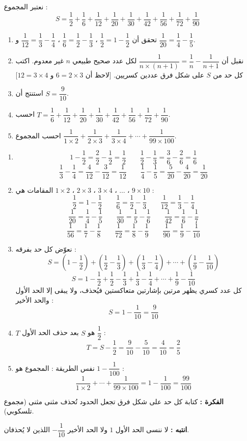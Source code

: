 \documentclass[12pt,a4paper]{article}
\begin{document}
\begin{corr}[title={مجموع تسعة أعداد كسرية}, stars=4, source={Axiomaths}]
نعتبر المجموع :
\[S=\dfrac{1}{2}+\dfrac{1}{6}+\dfrac{1}{12}+\dfrac{1}{20}+\dfrac{1}{30}+\dfrac{1}{42}+\dfrac{1}{56}+\dfrac{1}{72}+\dfrac{1}{90}\]
\begin{enumerate}
  \item تحقق أن $\dfrac{1}{2}=1-\dfrac{1}{2}$ ، $\dfrac{1}{6}=\dfrac{1}{2}-\dfrac{1}{3}$ ، $\dfrac{1}{12}=\dfrac{1}{3}-\dfrac{1}{4}$ و $\dfrac{1}{20}=\dfrac{1}{4}-\dfrac{1}{5}$.
  \item نقبل أن $\dfrac{1}{n\times(n+1)}=\dfrac{1}{n}-\dfrac{1}{n+1}$ لكل عدد صحيح طبيعي $n$ غير معدوم.
  اكتب كل حد من $S$ على شكل فرق عددين كسريين. [لاحظ أن $6=2\times3$ و $12=3\times4$]
  \item استنتج أن $S=\dfrac{9}{10}$.
  \item احسب $T=\dfrac{1}{6}+\dfrac{1}{12}+\dfrac{1}{20}+\dfrac{1}{30}+\dfrac{1}{42}+\dfrac{1}{56}+\dfrac{1}{72}+\dfrac{1}{90}$.
  \item احسب المجموع $\dfrac{1}{1\times2}+\dfrac{1}{2\times3}+\dfrac{1}{3\times4}+\cdots+\dfrac{1}{99\times100}$.
\end{enumerate}
\axsol
\begin{enumerate}[itemsep=14pt]
  \item
  \[1-\dfrac{1}{2}=\dfrac{2}{2}-\dfrac{1}{2}=\dfrac{1}{2}\qquad\dfrac{1}{2}-\dfrac{1}{3}=\dfrac{3}{6}-\dfrac{2}{6}=\dfrac{1}{6}\]
  \[\dfrac{1}{3}-\dfrac{1}{4}=\dfrac{4}{12}-\dfrac{3}{12}=\dfrac{1}{12}\qquad\dfrac{1}{4}-\dfrac{1}{5}=\dfrac{5}{20}-\dfrac{4}{20}=\dfrac{1}{20}\]
  \item المقامات هي $1\times2$ ، $2\times3$ ، $3\times4$ ، $\dots$ ، $9\times10$ :
  \[\dfrac{1}{2}=1-\dfrac{1}{2}\qquad\dfrac{1}{6}=\dfrac{1}{2}-\dfrac{1}{3}\qquad\dfrac{1}{12}=\dfrac{1}{3}-\dfrac{1}{4}\]
  \[\dfrac{1}{20}=\dfrac{1}{4}-\dfrac{1}{5}\qquad\dfrac{1}{30}=\dfrac{1}{5}-\dfrac{1}{6}\qquad\dfrac{1}{42}=\dfrac{1}{6}-\dfrac{1}{7}\]
  \[\dfrac{1}{56}=\dfrac{1}{7}-\dfrac{1}{8}\qquad\dfrac{1}{72}=\dfrac{1}{8}-\dfrac{1}{9}\qquad\dfrac{1}{90}=\dfrac{1}{9}-\dfrac{1}{10}\]
  \item نعوّض كل حد بفرقه :
  \[S=\left(1-\dfrac{1}{2}\right)+\left(\dfrac{1}{2}-\dfrac{1}{3}\right)+\left(\dfrac{1}{3}-\dfrac{1}{4}\right)+\cdots+\left(\dfrac{1}{9}-\dfrac{1}{10}\right)\]
  \[S=1-\dfrac{1}{2}+\dfrac{1}{2}-\dfrac{1}{3}+\dfrac{1}{3}-\dfrac{1}{4}+\cdots+\dfrac{1}{9}-\dfrac{1}{10}\]
  كل عدد كسري يظهر مرتين بإشارتين متعاكستين فيُحذف، ولا يبقى إلا الحد الأول والحد الأخير :
  \[S=1-\dfrac{1}{10}=\dfrac{9}{10}\]
  \item $T$ هو $S$ بعد حذف الحد الأول $\dfrac{1}{2}$ :
  \[T=S-\dfrac{1}{2}=\dfrac{9}{10}-\dfrac{5}{10}=\dfrac{4}{10}=\dfrac{2}{5}\]
  \item نفس الطريقة : المجموع هو $1-\dfrac{1}{100}$ :
  \[\dfrac{1}{1\times2}+\cdots+\dfrac{1}{99\times100}=1-\dfrac{1}{100}=\dfrac{99}{100}\]
\end{enumerate}
\textbf{الفكرة :} كتابة كل حد على شكل فرق تجعل الحدود تُحذف مثنى مثنى (مجموع تلسكوبي).

\textbf{انتبه :} لا ننسى الحد الأول $1$ ولا الحد الأخير $-\dfrac{1}{10}$ اللذين لا يُحذفان.
\end{corr}
\end{document}
